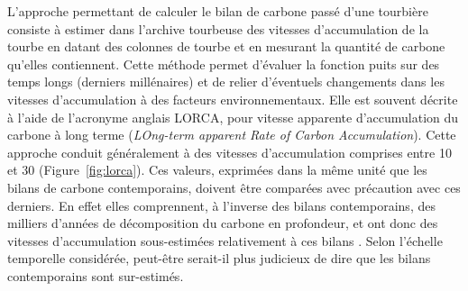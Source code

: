 L'approche permettant de calculer le bilan de carbone passé d'une tourbière consiste à estimer dans l'archive tourbeuse des vitesses d'accumulation de la tourbe en datant des colonnes de tourbe et en mesurant la quantité de carbone qu'elles contiennent.
Cette méthode permet d'évaluer la fonction puits sur des temps longs (derniers millénaires) et de relier d'éventuels changements dans les vitesses d'accumulation à des facteurs environnementaux.
Elle est souvent décrite à l'aide de l'acronyme anglais LORCA, pour vitesse apparente d'accumulation du carbone à long terme (\textit{LOng-term apparent Rate of Carbon Accumulation}).
Cette approche conduit généralement à des vitesses d'accumulation comprises entre 10 et \SI{30}{\gcma} (Figure~\ref{fig:lorca}).
Ces valeurs, exprimées dans la même unité que les bilans de carbone contemporains, doivent être comparées avec précaution avec ces derniers.
En effet elles comprennent, à l'inverse des bilans contemporains, des milliers d'années de décomposition du carbone en profondeur, et ont donc des vitesses d'accumulation sous-estimées relativement à ces bilans \citep{yu2009}.
Selon l'échelle temporelle considérée, peut-être serait-il plus judicieux de dire que les bilans contemporains sont sur-estimés.

